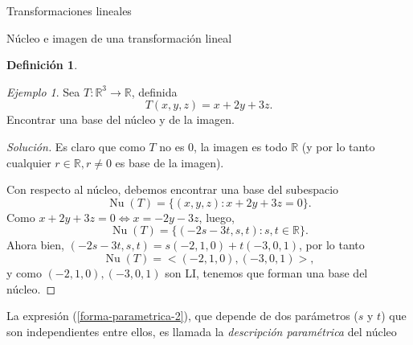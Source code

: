 \documentclass[a4paper,12pt,twoside,spanish,reqno]{amsbook}
\numberwithin{equation}{section}
\theoremstyle{definition}
\newtheorem{definicion}[teorema]{Definici\'on}
\theoremstyle{remark}
\newtheorem*{ejemplo*}{Ejemplo}
\newcommand{\nuc}{\operatorname{Nu}}
\newcommand{\R}{\mathbb R}
\begin{document}
\begin{chapter}{Transformaciones lineales}
\begin{section}{Núcleo e imagen de una transformación lineal}
\begin{definicion}
        \end{definicion}
                
        \begin{ejemplo*}
            Sea $T: \R^3 \to \R$, definida
            $$
            T(x,y,z) = x +2y +3z.
            $$
            Encontrar una base del núcleo y de la imagen.
            \begin{proof}[Solución]
                Es claro que como $T$ no es 0, la imagen es todo $\R$ (y por lo tanto cualquier $r\in \R, r \ne 0$ es base de la imagen). 
                
                Con respecto al núcleo,  debemos encontrar una base del subespacio
                $$
                \nuc(T) = \{(x,y,z): x+2y+3z =0\}.
                $$
                Como $x+2y+3z =0 \Leftrightarrow x = -2y-3z$, luego, 
                \begin{equation}\label{forma-parametrica-2}
                    \nuc(T) =  \{(-2s-3t,s,t): s,t \in \R\}.
                \end{equation}
                Ahora bien, $(-2s-3t,s,t) = s(-2,1,0)+t(-3,0,1)$, por lo tanto 
                \begin{equation*}
                \nuc(T) =  <(-2,1,0),(-3,0,1)>,
                \end{equation*}
                y  como $(-2,1,0),(-3,0,1)$ son LI, tenemos que forman una base del núcleo. 
            \end{proof}
        
        La expresión (\ref{forma-parametrica-2}),  que depende de dos parámetros ($s$ y $t$) que son independientes entre ellos, es llamada la \textit{descripción paramétrica} del núcleo	
        \end{ejemplo*}
        

\end{section}
\end{chapter}
\end{document}
